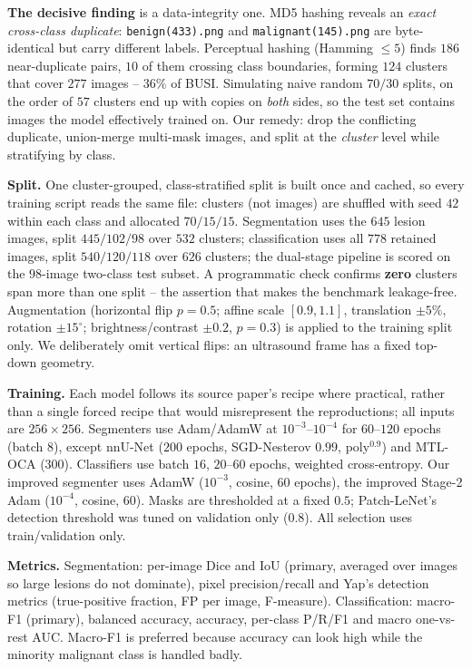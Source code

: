 \documentclass[10pt,twocolumn]{article}
\begin{document}
\textbf{The decisive finding} is a data-integrity one. MD5 hashing reveals an
\emph{exact cross-class duplicate}: \texttt{benign(433).png} and
\texttt{malignant(145).png} are byte-identical but carry different labels.
Perceptual hashing (Hamming $\leq5$) finds $186$ near-duplicate pairs, $10$ of them
crossing class boundaries, forming $124$ clusters that cover $277$ images -- $36\%$
of BUSI. Simulating naive random $70/30$ splits, on the order of $57$ clusters end
up with copies on \emph{both} sides, so the test set contains images the model
effectively trained on. Our remedy: drop the conflicting duplicate, union-merge
multi-mask images, and split at the \emph{cluster} level while stratifying by class.

\textbf{Split.} One cluster-grouped, class-stratified split is built once and
cached, so every training script reads the same file: clusters (not images) are
shuffled with seed $42$ within each class and allocated $70/15/15$. Segmentation
uses the $645$ lesion images, split $445/102/98$ over $532$ clusters;
classification uses all $778$ retained images, split $540/120/118$ over $626$
clusters; the dual-stage pipeline is scored on the $98$-image two-class test
subset. A programmatic check confirms \textbf{zero} clusters span more than one
split -- the assertion that makes the benchmark leakage-free. Augmentation
(horizontal flip $p{=}0.5$; affine scale $[0.9,1.1]$, translation $\pm5\%$,
rotation $\pm15^\circ$; brightness/contrast $\pm0.2$, $p{=}0.3$) is applied to the
training split only. We deliberately omit vertical flips: an ultrasound frame has a
fixed top-down geometry.

\textbf{Training.} Each model follows its source paper's recipe where practical,
rather than a single forced recipe that would misrepresent the reproductions; all
inputs are $256\times256$. Segmenters use Adam/AdamW at $10^{-3}$--$10^{-4}$ for
$60$--$120$ epochs (batch $8$), except nnU-Net ($200$ epochs, SGD-Nesterov $0.99$,
poly$^{0.9}$) and MTL-OCA ($300$). Classifiers use batch $16$, $20$--$60$ epochs,
weighted cross-entropy. Our improved segmenter uses AdamW ($10^{-3}$, cosine, $60$
epochs), the improved Stage-2 Adam ($10^{-4}$, cosine, $60$). Masks are
thresholded at a fixed $0.5$; Patch-LeNet's detection threshold was tuned on
validation only ($0.8$). All selection uses train/validation only.

\textbf{Metrics.} Segmentation: per-image Dice and IoU (primary, averaged over
images so large lesions do not dominate), pixel precision/recall and Yap's
detection metrics (true-positive fraction, FP per image, F-measure).
Classification: macro-F1 (primary), balanced accuracy, accuracy, per-class
P/R/F1 and macro one-vs-rest AUC. Macro-F1 is preferred because accuracy can look
high while the minority malignant class is handled badly.
\end{document}
